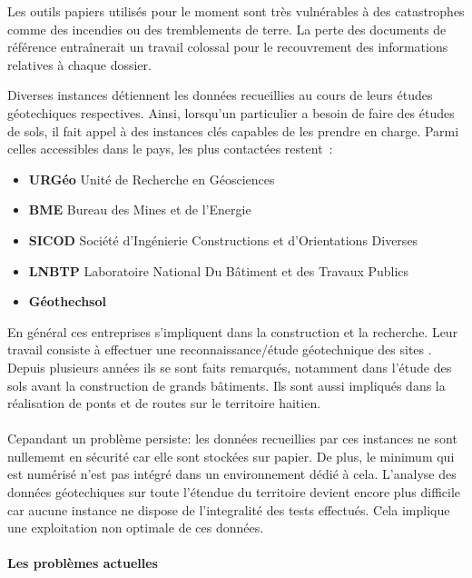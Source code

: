 \par
Les outils papiers utilisés pour le moment sont très vulnérables à des
catastrophes comme des incendies ou des tremblements de terre. La perte 
des documents de référence entraînerait un travail
colossal pour le recouvrement des informations relatives à chaque 
dossier.
\par
Diverses instances détiennent les données recueillies au cours
de leurs études géotechiques respectives. 
Ainsi, lorsqu’un particulier a besoin de faire des études de sols, il 
fait appel à des instances clés capables de les prendre en charge. 
Parmi celles accessibles dans le pays, les plus contactées restent :
\begin{itemize}
    \item \textbf{URGéo}
    Unité de Recherche en Géosciences 
    \item \textbf{BME}
    Bureau des Mines et de l’Energie
    \item \textbf{SICOD}
    Société d’Ingénierie Constructions et d’Orientations Diverses
    \item \textbf{LNBTP}
    Laboratoire National Du Bâtiment et des Travaux Publics 
    \item \textbf{Géothechsol}
\end{itemize}   

\par
En général ces entreprises s'impliquent dans la construction et la recherche. 
Leur travail consiste à effectuer une reconnaissance/étude géotechnique des sites .
Depuis plusieurs années ils se sont faits remarqués, notamment dans
l'étude des sols avant la construction de grands bâtiments. Ils sont aussi impliqués
dans la réalisation de ponts et de routes sur le territoire
haitien. 
\paragraph{}
Cepandant un problème persiste: les données recueillies par ces instances
ne sont nullememt en sécurité car elle sont stockées sur papier.
De plus, le minimum qui est numérisé n'est pas intégré dans un environnement 
dédié à cela.
L'analyse des données géotechiques sur toute l'étendue du territoire devient
encore plus difficile car aucune instance ne dispose de l'integralité des tests effectués.
Cela implique une exploitation non optimale de ces données.
\paragraph{Les problèmes actuelles}
